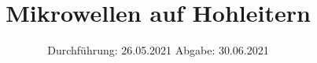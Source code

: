 

\subject{V53}
\title{Mikrowellen auf Hohleitern}
\date{%
  Durchführung: 26.05.2021
  \hspace{3em}
  Abgabe: 30.06.2021
}



\maketitle
\thispagestyle{empty}
\tableofcontents
\newpage








\printbibliography{}


